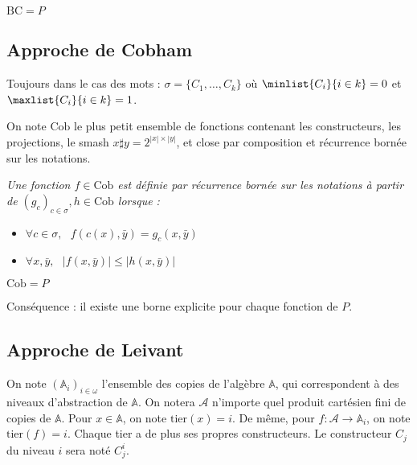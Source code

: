\documentclass{article}
\newcommand{\bbA}{\mathbb{A}}
\begin{document}
		
		\begin{theorem}
			$\text{BC} = P$
		\end{theorem}
		
		
		\subsection{Approche de Cobham}
		
			
		Toujours dans le cas des mots : $\sigma = \{ C_1, \dots, C_k \}$ où $\minlist{C_i}{i \in k} = 0$ et $\maxlist{C_i}{i \in k} = 1$.
		
		
		\begin{definition}
			On note $\text{Cob}$ le plus petit ensemble de fonctions contenant les constructeurs, les projections, le smash $x \sharp y = 2^{\left| x \right| \times \left| y\right|}$, et close par composition et récurrence bornée sur les notations.
			
			
			\emph{Une fonction $f \in \text{Cob}$ est définie par récurrence bornée sur les notations à partir de $(g_c)_{c \in \sigma}, h \in \text{Cob}$ lorsque :}
			
			\begin{itemize}[itemsep=-1mm]
				\item 	$\forall c \in \sigma, \:\:\: f\left( c(x), \bar{y} \right) = g_c\left( x, \bar{y} \right)$
				\item 	$\forall x, \bar{y}, \:\:\: \left| f \left( x, \bar{y} \right) \right| \leq \left| h \left( x, \bar{y} \right) \right|$
			\end{itemize}
			
		\end{definition}
		
		
		\begin{theorem}[Cobham]
			$\text{Cob} = P$
		\end{theorem}
			
		Conséquence : il existe une borne explicite pour chaque fonction de $P$. 
		
		
		
		\subsection{Approche de Leivant}
	
		
		On note $(\bbA_i)_{i\in \omega}$ l'ensemble des copies de l'algèbre $\bbA$, qui correspondent à des niveaux d'abstraction de $\bbA$. On notera $\mathcal{A}$ n'importe quel produit cartésien fini de copies de $\bbA$. Pour $x\in \bbA$, on note $\text{tier}(x) = i$. De même, pour $f : \mathcal{A} \to \bbA_i$, on note $\text{tier}(f) = i$. Chaque tier a de plus ses propres constructeurs. Le constructeur $C_j$ du niveau $i$ sera noté $C_j^i$. 
		
\end{document}
